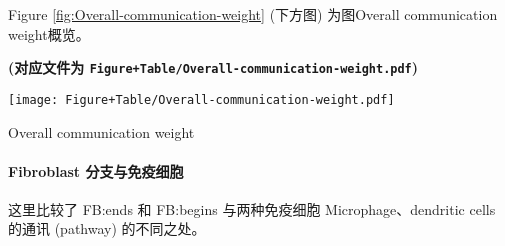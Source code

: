 \documentclass[
]{article}
\begin{document}
Figure \ref{fig:Overall-communication-weight} (下方图) 为图Overall communication weight概览。

\textbf{(对应文件为 \texttt{Figure+Table/Overall-communication-weight.pdf})}

\def\@captype{figure}
\begin{center}
\texttt{[image: Figure+Table/Overall-communication-weight.pdf]}
\caption{Overall communication weight}\label{fig:Overall-communication-weight}
\end{center}

\hypertarget{fibroblast-ux5206ux652fux4e0eux514dux75abux7ec6ux80de}{%
\paragraph{Fibroblast 分支与免疫细胞}\label{fibroblast-ux5206ux652fux4e0eux514dux75abux7ec6ux80de}}

这里比较了 FB:ends 和 FB:begins 与两种免疫细胞 Microphage、dendritic cells 的通讯 (pathway) 的不同之处。
\end{document}
